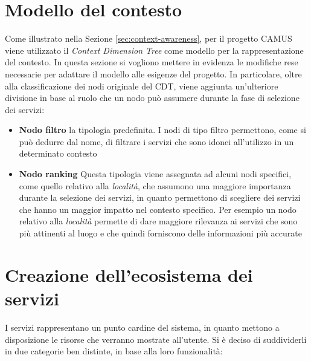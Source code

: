 \section{Modello del contesto\label{sec:modello-contesto}}

Come illustrato nella Sezione \ref{sec:context-awareness}, per il progetto CAMUS viene utilizzato il \emph{Context Dimension Tree} come modello per la rappresentazione del contesto. In questa sezione si vogliono mettere in evidenza le modifiche rese necessarie per adattare il modello alle esigenze del progetto. In particolare, oltre alla classificazione dei nodi originale del CDT, viene aggiunta un'ulteriore divisione in base al ruolo che un nodo può assumere durante la fase di selezione dei servizi:

\begin{itemize}
	\item \textbf{Nodo filtro}
	\upe la tipologia predefinita. I nodi di tipo filtro permettono, come si può dedurre dal nome, di filtrare i servizi che sono idonei all'utilizzo in un determinato contesto
	\item \textbf{Nodo ranking}
	Questa tipologia viene assegnata ad alcuni nodi specifici, come quello relativo alla \emph{località}, che assumono una maggiore importanza durante la selezione dei servizi, in quanto permettono di scegliere dei servizi che hanno un maggior impatto nel contesto specifico. Per esempio un nodo relativo alla \emph{località} permette di dare maggiore rilevanza ai servizi che sono più attinenti al luogo e che quindi forniscono delle informazioni più accurate
\end{itemize}

\section{Creazione dell'ecosistema dei servizi\label{sec:ecosistema-servizi}}

I servizi rappresentano un punto cardine del sistema, in quanto mettono a disposizione le risorse che verranno mostrate all'utente. Si è deciso di suddividerli in due categorie ben distinte, in base alla loro funzionalità:


